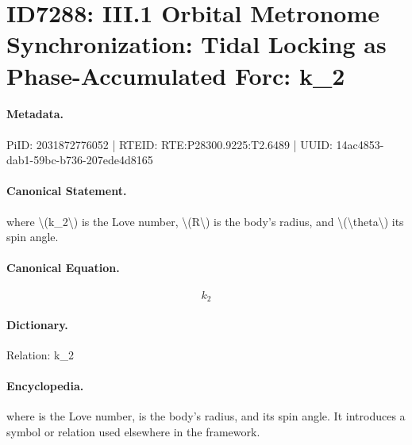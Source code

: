\section*{ID7288: III.1 Orbital Metronome Synchronization: Tidal Locking as Phase-Accumulated Forc: k\_2}
\paragraph{Metadata.}
PiID: 2031872776052 | RTEID: RTE:P28300.9225:T2.6489 | UUID: 14ac4853-dab1-59bc-b736-207ede4d8165

\paragraph{Canonical Statement.}
where \textbackslash{}(k\_2\textbackslash{}) is the Love number, \textbackslash{}(R\textbackslash{}) is the body’s radius, and \textbackslash{}(\textbackslash{}theta\textbackslash{}) its spin angle.

\paragraph{Canonical Equation.}
\[
k_2
\]

\paragraph{Dictionary.}
Relation: k\_2

\paragraph{Encyclopedia.}
where is the Love number, is the body’s radius, and its spin angle. It introduces a symbol or relation used elsewhere in the framework.
